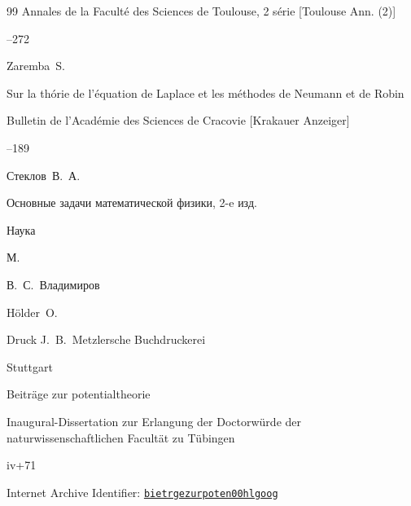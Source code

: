 \begin{thebibliography}{99}
\jour Annales de la Facult\'e des Sciences de Toulouse\rm, 2 s\'erie [Toulouse Ann. (2)]



--272







\by Zaremba~S.

\paper Sur la th\'orie de l'\'equation de Laplace et les m\'ethodes de Neumann et de Robin

\jour Bulletin de l'Acad\'emie des Sciences de Cracovie \rm [Krakauer Anzeiger]


--189





\by Стеклов~В.~А.

\book Основные задачи математической физики\rm, 2-e изд.


\publ Наука

\publaddr М.

\ed В.~С.~Владимиров





\by H\"older~O.


\publ Druck J.~B.~Metzlersche Buchdruckerei

\publaddr Stuttgart

\thesis Beitr\"age zur potentialtheorie

\thesisinfo Inaugural-Dissertation zur Erlangung der Doctor\-w\"urde der naturwissenschaftlichen Facult\"at zu T\"ubingen

\totalpages iv+71

\elink Internet Archive Identifier: \href{https://archive.org/details/bietrgezurpoten00hlgoog}{\tt bietrgezurpoten00hlgoog}






\end{thebibliography}
